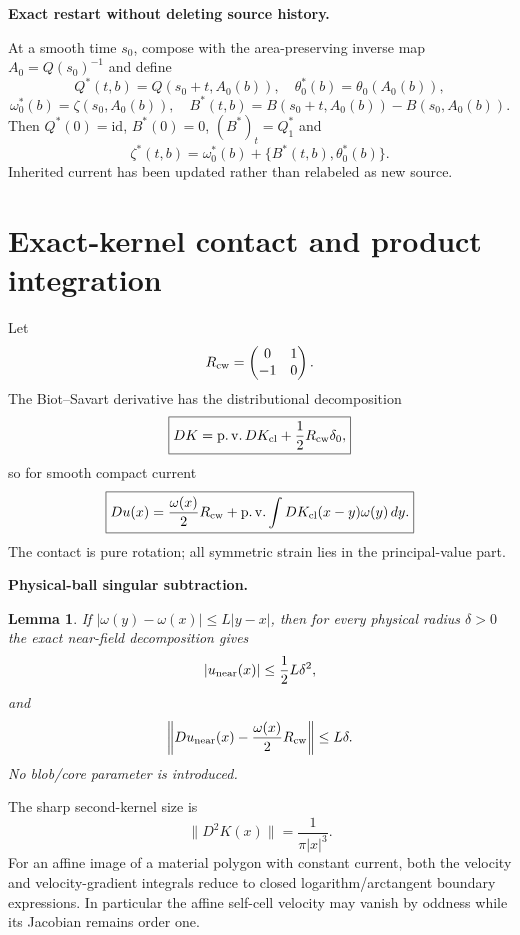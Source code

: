 \documentclass[11pt]{article}
\newtheorem{lemma}[theorem]{Lemma}\newtheorem{corollary}[theorem]{Corollary}
\theoremstyle{definition}\newtheorem{definition}[theorem]{Definition}\newtheorem{problem}[theorem]{Problem}
\theoremstyle{remark}\newtheorem{remark}[theorem]{Remark}
\begin{document}
\medskip
\noindent\textbf{Exact restart without deleting source history.}
\begin{proposition}
At a smooth time $s_0$, compose with the area-preserving inverse map
$A_0=Q(s_0)^{-1}$ and define
\[
 Q^*(t,b)=Q(s_0+t,A_0(b)),
 \quad
 \theta_0^*(b)=\theta_0(A_0(b)),
\]
\[
 \omega_0^*(b)=\zeta(s_0,A_0(b)),
 \quad
 B^*(t,b)=B(s_0+t,A_0(b))-B(s_0,A_0(b)).
\]
Then $Q^*(0)=\mathrm{id}$, $B^*(0)=0$, $(B^*)_t=Q_1^*$ and
\[
 \zeta^*(t,b)=\omega_0^*(b)+\{B^*(t,b),\theta_0^*(b)\}.
\]
Inherited current has been updated rather than relabeled as new source.
\end{proposition}

\section{Exact-kernel contact and product integration}
\label{sec:exact-kernel}
Let
\[
R_{\rm cw}=\begin{pmatrix}0&1\\-1&0\end{pmatrix}.
\]
The Biot--Savart derivative has the distributional decomposition
\[
 \boxed{
 DK=\operatorname{p.v.}DK_{\rm cl}+\frac12R_{\rm cw}\delta_0,
 }
\]
so for smooth compact current
\[
 \boxed{
 Du(x)=\frac{\omega(x)}2R_{\rm cw}
 +\operatorname{p.v.}\int DK_{\rm cl}(x-y)\omega(y)\,dy.
 }
\]
The contact is pure rotation; all symmetric strain lies in the principal-value
part.

\medskip
\noindent\textbf{Physical-ball singular subtraction.}
\begin{lemma}
If $|\omega(y)-\omega(x)|\le L|y-x|$, then for every physical radius
$\delta>0$ the exact near-field decomposition gives
\[
 |u_{\rm near}(x)|\le\frac12L\delta^2,
\]
and
\[
 \left\|Du_{\rm near}(x)-\frac{\omega(x)}2R_{\rm cw}\right\|
 \le L\delta.
\]
No blob/core parameter is introduced.
\end{lemma}

The sharp second-kernel size is
\[
 \boxed{\|D^2K(x)\|=\frac1{\pi|x|^3}.}
\]
For an affine image of a material polygon with constant current, both the
velocity and velocity-gradient integrals reduce to closed logarithm/arctangent
boundary expressions. In particular the affine self-cell velocity may vanish
by oddness while its Jacobian remains order one.
\end{document}
